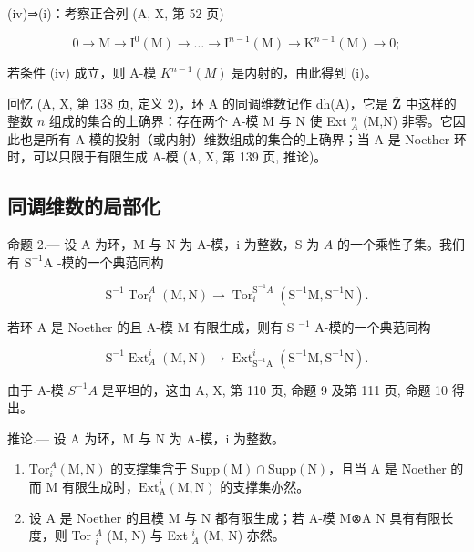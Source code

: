 (iv)⇒(i)：考察正合列 (A, X, 第 52 页)

\[
0 \longrightarrow \mathrm{M} \longrightarrow \mathrm{I} ^ {0} (\mathrm{M}) \longrightarrow \dots \longrightarrow \mathrm{I} ^ {n - 1} (\mathrm{M}) \longrightarrow \mathrm{K} ^ {n - 1} (\mathrm{M}) \longrightarrow 0;
\]

若条件 (iv) 成立，则 A-模 \(K^{n-1}(M)\) 是内射的，由此得到 (i)。

回忆 (A, X, 第 138 页, 定义 2)，环 A 的同调维数记作 dh(A)，它是 \(\overline{\mathbf{Z}}\) 中这样的整数 \(n\) 组成的集合的上确界：存在两个 A-模 M 与 N 使 Ext \(_{A}^{n}\) (M,N) 非零。它因此也是所有 A-模的投射（或内射）维数组成的集合的上确界；当 A 是 Noether 环时，可以只限于有限生成 A-模 (A, X, 第 139 页, 推论)。

\subsection{同调维数的局部化}

命题 2.--- 设 A 为环，M 与 N 为 A-模，i 为整数，S 为 \(A\) 的一个乘性子集。我们有 \(\mathrm{S}^{-1}\mathrm{A}\) -模的一个典范同构

\[
\mathrm{S} ^ {- 1} \operatorname{Tor} _ {i} ^ {A} (\mathrm{M}, \mathrm{N}) \longrightarrow \operatorname{Tor} _ {i} ^ {\mathrm{S} ^ {- 1} A} (\mathrm{S} ^ {- 1} \mathrm{M}, \mathrm{S} ^ {- 1} \mathrm{N}).
\]

若环 A 是 Noether 的且 A-模 M 有限生成，则有 S \(^{-1}\) A-模的一个典范同构

\[
\mathrm{S} ^ {- 1} \operatorname{Ext} _ {A} ^ {i} (\mathrm{M}, \mathrm{N}) \longrightarrow \operatorname{Ext} _ {\mathrm{S} ^ {- 1} \mathrm{A}} ^ {i} (\mathrm{S} ^ {- 1} \mathrm{M}, \mathrm{S} ^ {- 1} \mathrm{N}).
\]

由于 A-模 \(S^{-1}A\) 是平坦的，这由 A, X, 第 110 页, 命题 9 及第 111 页, 命题 10 得出。

推论.--- 设 A 为环，M 与 N 为 A-模，i 为整数。

\begin{enumerate}
\def\labelenumi{\alph{enumi})}
\item
  \(\mathrm{Tor}_{i}^{A}(\mathrm{M},\mathrm{N})\) 的支撑集含于 \(\mathrm{Supp}(\mathrm{M})\cap \mathrm{Supp}(\mathrm{N})\)，且当 A 是 Noether 的而 M 有限生成时，\(\mathrm{Ext}_{\mathrm{A}}^{i}(\mathrm{M},\mathrm{N})\) 的支撑集亦然。
\item
  设 A 是 Noether 的且模 M 与 N 都有限生成；若 A-模 M⊗A N 具有有限长度，则 Tor \(_{i}^{A}\) (M, N) 与 Ext \(_{A}^{i}\) (M, N) 亦然。
\end{enumerate}

